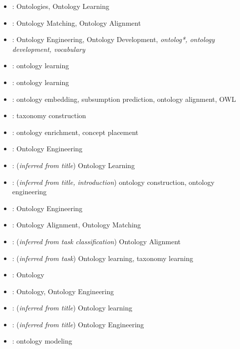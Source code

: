 \documentclass[a4paper,colorinlistoftodos]{article}
\begin{document}
\begin{itemize}
  \item \citet{babaei2023Llms4olLargeLanguage}: Ontologies, Ontology Learning
  \item \citet{babaei2025Llms4omMatchingOntologies}: Ontology Matching,
    Ontology Alignment
  \item \citet{li2025LargeLanguageModels}: Ontology Engineering, Ontology
    Development, \textit{ontolog*, ontology development,
    vocabulary}
  \item \citet{mai2024DoLlmsReally}: ontology learning
  \item \citet{bakker2024OntologyLearningText}: ontology learning
  \item \citet{chen2023ContextualSemanticEmbeddings}: ontology embedding,
    subsumption prediction, ontology alignment, OWL
  \item \citet{chen2023PromptingOrFine}: taxonomy construction
  \item \citet{dong2024LanguageModelBased}: ontology enrichment, concept
    placement
  \item \citet{doumanas2024IntegratingLlmsIn}: Ontology Engineering
  \item \citet{du2024ShortReviewOntology}: (\textit{inferred from title})
    Ontology Learning
  \item \citet{funk2023TowardsOntologyConstruction}: (\textit{inferred from
      title, introduction}) ontology construction, ontology engineering
  \item \citet{garijo2024LlmsOntologyEngineering}: Ontology Engineering
  \item \citet{he2023ExploringLargeLanguage}: Ontology Alignment, Ontology
    Matching 
  \item \citet{he2023LanguageModelAnalysis}: (\textit{inferred from task
      classification}) Ontology Alignment
  \item \citet{jain2022DistillingHypernymyRelations}: (\textit{inferred from
      task}) Ontology learning, taxonomy learning
  \item \citet{kommineni2024HumanExpertsMachines}: Ontology
  \item \citet{lippolis2025OntologyGenerationUsing}: Ontology, Ontology
    Engineering
  \item \citet{lo2024EndEndOntology}: (\textit{inferred from title}) Ontology
    learning
  \item \citet{mateiu2023OntologyEngineeringWith}: (\textit{inferred from
      title}) Ontology Engineering
  \item \citet{norouzi2024OntologyPopulationUsing}: ontology modeling

\end{itemize}
\end{document}
